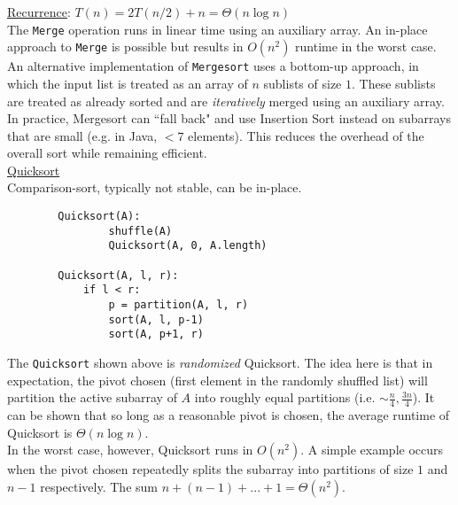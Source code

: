 \documentclass[12pt, fleqn]{general}
\begin{document}
\begin{multicols*}{2}
    \underline{Recurrence}: $T(n) = 2T(n/2) + n = \Theta(n \log n)$\\

    The \texttt{Merge} operation runs in linear time using an auxiliary array. An in-place approach to \texttt{Merge} is possible but results in $O(n^2)$ runtime in the worst case.\\

    An alternative implementation of \texttt{Mergesort} uses a bottom-up approach, in which the input list is treated as an array of $n$ sublists of size $1$. These sublists are treated as already sorted and are \emph{iteratively} merged using an auxiliary array.\\

    In practice, Mergesort can ``fall back" and use Insertion Sort instead on subarrays that are small (e.g. in Java, $ < 7$ elements). This reduces the overhead of the overall sort while remaining efficient.\\


    {\large \underline{Quicksort}}\\

    Comparison-sort, typically not stable, can be in-place.

    \begin{framed}
    \begingroup
    \makeatletter
    \@totalleftmargin=-1.5cm
    \begin{verbatim}
        Quicksort(A):
                shuffle(A)
                Quicksort(A, 0, A.length)

        Quicksort(A, l, r):
            if l < r:
                p = partition(A, l, r)
                sort(A, l, p-1)
                sort(A, p+1, r)
    \end{verbatim}
    \makeatother
    \endgroup
    \end{framed}

    The \texttt{Quicksort} shown above is \emph{randomized} Quicksort. The idea here is that in expectation, the pivot chosen (first element in the randomly shuffled list) will partition the active subarray of $A$ into roughly equal partitions (i.e. $\sim \frac{n}{4}, \frac{3n}{4}$). It can be shown that so long as a reasonable pivot is chosen, the average runtime of Quicksort is $\Theta(n\log n)$.\\

    In the worst case, however, Quicksort runs in $O(n^2)$. A simple example occurs when the pivot chosen repeatedly splits the subarray into partitions of size $1$ and $n-1$ respectively. The sum $n + (n-1) + ... + 1 = \Theta(n^2)$.\\


\end{multicols*}
\end{document}
